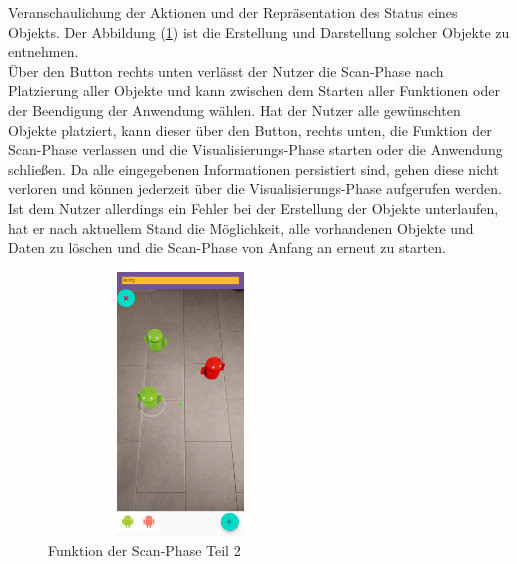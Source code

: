 Veranschaulichung der Aktionen und der Repräsentation des Status eines Objekts. Der Abbildung (\ref{pic:place_objects}) ist die Erstellung und 
Darstellung solcher Objekte zu entnehmen. 
\\ 
\linebreak
Über den Button rechts unten verlässt der Nutzer die Scan-Phase nach Platzierung aller Objekte und kann zwischen dem Starten aller Funktionen oder der Beendigung 
der Anwendung wählen. Hat der Nutzer alle gewünschten Objekte platziert, kann dieser über den Button, rechts unten, die Funktion der Scan-Phase verlassen und die 
Visualisierungs-Phase starten oder die Anwendung schließen. Da alle eingegebenen Informationen persistiert sind, gehen diese nicht verloren und können jederzeit 
über die Visualisierungs-Phase aufgerufen werden. Ist dem Nutzer allerdings ein Fehler bei der Erstellung der Objekte unterlaufen, hat er nach aktuellem Stand 
die Möglichkeit, alle vorhandenen Objekte und Daten zu löschen und die Scan-Phase von Anfang an erneut zu starten.  
\begin{figure}[hbt!]
    \centering
    \includegraphics[width=7cm,height=7cm,keepaspectratio]{4Umsetzung/Bilder/place_objects_view.jpg}
    \caption{Funktion der Scan-Phase Teil 2}
    \label{pic:place_objects}
\end{figure}
